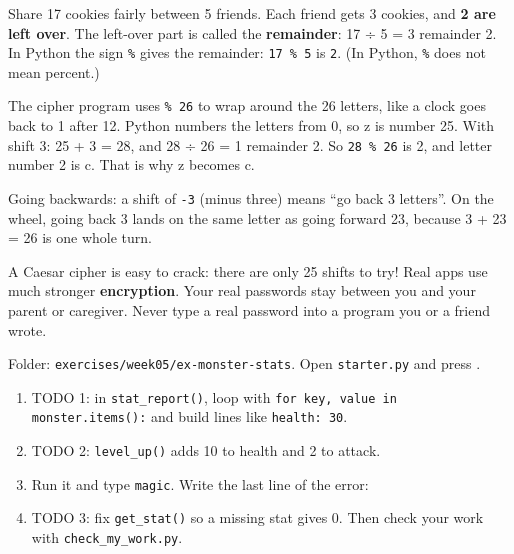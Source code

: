 \begin{tip}
Share 17 cookies fairly between 5 friends. Each friend gets 3 cookies, and \textbf{2 are left over}.
The left-over part is called the \textbf{remainder}: 17 ÷ 5 = 3 remainder 2.
In Python the sign \texttt{\%} gives the remainder: \texttt{17 \% 5} is \texttt{2}. (In Python, \texttt{\%} does not mean percent.)
\par\smallskip
The cipher program uses \texttt{\% 26} to wrap around the 26 letters, like a clock goes back to 1 after 12.
Python numbers the letters from 0, so z is number 25. With shift 3: 25 + 3 = 28, and 28 ÷ 26 = 1 remainder 2.
So \texttt{28 \% 26} is 2, and letter number 2 is c. That is why z becomes c.
\par\smallskip
Going backwards: a shift of \texttt{-3} (minus three) means \enquote{go back 3 letters}. On the wheel, going back 3
lands on the same letter as going forward 23, because 3 + 23 = 26 is one whole turn.
\end{tip}

\begin{tip}
A Caesar cipher is easy to crack: there are only 25 shifts to try! Real apps use much stronger \textbf{encryption}.
Your real passwords stay between you and your parent or caregiver. Never type a real password into a program you or a friend wrote.
\end{tip}

\begin{exercise}
Folder: \texttt{exercises/week05/ex-monster-stats}. Open \texttt{starter.py} and press .
\begin{enumerate}[leftmargin=1.4em]
  \item TODO 1: in \texttt{stat\_report()}, loop with \texttt{for key, value in monster.items():} and build lines like \texttt{health: 30}.
  \item TODO 2: \texttt{level\_up()} adds 10 to health and 2 to attack.
  \item Run it and type \texttt{magic}. Write the last line of the error:
  \item TODO 3: fix \texttt{get\_stat()} so a missing stat gives 0. Then check your work with \texttt{check\_my\_work.py}.
\end{enumerate}
\end{exercise}

